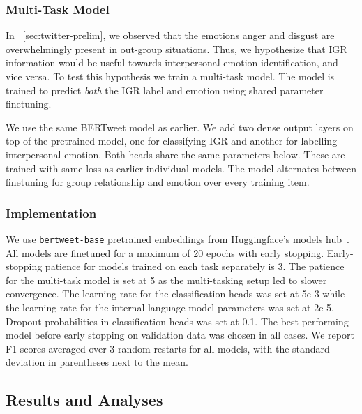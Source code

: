 \subsubsection{Multi-Task Model}

In \textsection~\ref{sec:twitter-prelim}, we observed that the emotions anger and disgust are overwhelmingly present in out-group situations. Thus, we hypothesize that IGR information would be useful towards interpersonal emotion identification, and vice versa. To test this hypothesis we train a multi-task model. The model is trained to predict \emph{both} the IGR label and emotion using shared parameter finetuning.

We use the same BERTweet model as earlier. We add two dense output layers on top of the pretrained model, one for classifying IGR and another for labelling interpersonal emotion. Both heads share the same parameters below. These are trained with same loss as earlier individual models. The model alternates between finetuning for group relationship and emotion over every training item.

\subsubsection{Implementation}
We use \texttt{bertweet-base} pretrained embeddings from Huggingface's models hub~\citep{wolf-etal-2020-transformers}.
All models are finetuned for a maximum of 20 epochs with early stopping. Early-stopping patience for models trained on each task separately is 3. The patience for the multi-task model is set at 5 as the multi-tasking setup led to slower convergence. The learning rate for the classification heads was set at 5e-3 while the learning rate for the internal language model parameters was set at 2e-5. Dropout probabilities in classification heads was set at 0.1. The best performing model before early stopping on validation data was chosen in all cases. We report F1 scores averaged over 3 random restarts for all models, with the standard deviation in parentheses next to the mean.

\subsection{Results and Analyses}
\label{subsec:twitter-results}



